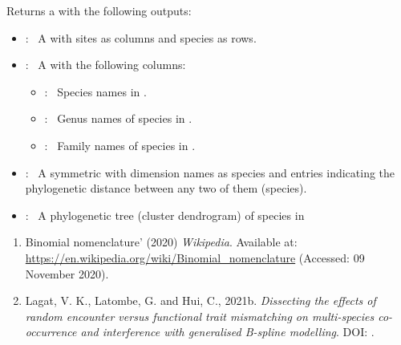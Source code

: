 \documentclass[a4paper]{book}
\begin{document}
\begin{Value}
Returns a  with the following outputs:
\begin{itemize}

\item{} :  A  with sites as columns and species as rows.
\item{} :  A  with the following columns:
\begin{itemize}

\item{} :  Species names in .
\item{} :  Genus names of species in .
\item{} :  Family names of species in .

\end{itemize}

\item{} :  A symmetric  with dimension names as species and entries indicating the
phylogenetic distance between any two of them (species).
\item{} :  A phylogenetic tree (cluster dendrogram) of species in 

\end{itemize}

\end{Value}
%
\begin{References}\relax
\begin{enumerate}

\item{} Binomial nomenclature' (2020) \emph{Wikipedia}. Available at:
\url{https://en.wikipedia.org/wiki/Binomial_nomenclature} (Accessed: 09 November 2020).

\item{} Lagat, V. K., Latombe, G. and Hui, C., 2021b. \emph{Dissecting the effects of random
encounter versus functional trait mismatching on multi-species co-occurrence and
interference with generalised B-spline modelling}. DOI: .

\end{enumerate}

\end{References}
%
\end{document}
